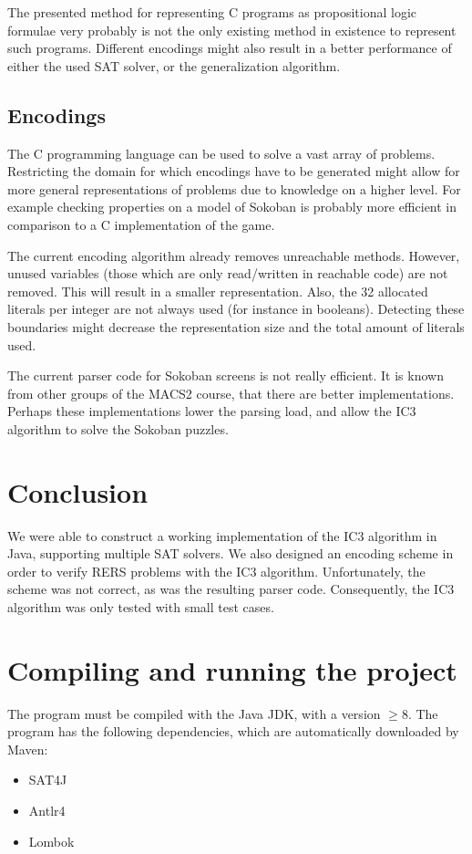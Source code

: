 \documentclass[a4paper]{article}
\begin{document}
The presented method for representing C programs as propositional logic formulae very probably is not the only existing method in existence to represent such programs. Different encodings might also result in a better performance of either the used SAT solver, or the generalization algorithm.

\subsection{Encodings}
The C programming language can be used to solve a vast array of problems. %
Restricting the domain for which encodings have to be generated might allow for more general representations of problems due to knowledge on a higher level. For example checking properties on a model of Sokoban is probably more efficient in comparison to a C implementation of the game.

The current encoding algorithm already removes unreachable methods. However, unused variables (those which are only read/written in reachable code) are not removed. This will result in a smaller representation. Also, the 32 allocated literals per integer are not always used (for instance in booleans). Detecting these boundaries might decrease the representation size and the total amount of literals used.

The current parser code for Sokoban screens is not really efficient.
It is known from other groups of the MACS2 course, that there are better implementations. Perhaps these implementations lower the parsing load, and allow the IC3 algorithm to solve the Sokoban puzzles.

\section{Conclusion}
We were able to construct a working implementation of the IC3 algorithm in Java, supporting multiple SAT solvers. We also designed an encoding scheme in order to verify RERS problems with the IC3 algorithm. Unfortunately, the scheme was not correct, as was the resulting parser code. Consequently, the IC3 algorithm was only tested with small test cases.

\newpage



\newpage
\appendix
\section{Compiling and running the project}
The program must be compiled with the Java JDK, with a version $\geq 8$. The program has the following dependencies, which are automatically downloaded by Maven:
\begin{itemize}
\item SAT4J
\item Antlr4
\item Lombok
\end{itemize}
\end{document}
